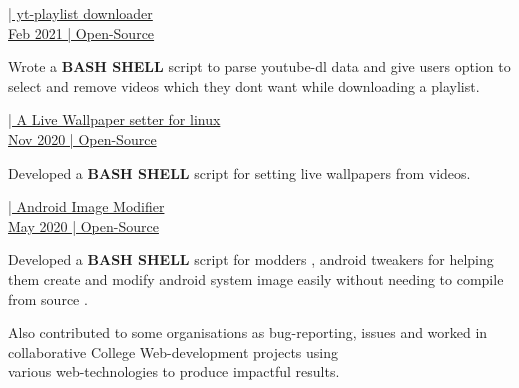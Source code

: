 \documentclass[]{deedy-resume-openfont}
\begin{document}
\begin{minipage}[t]{0.66\textwidth}
\href{https://github.com/creator54/yt-playlist}{| yt-playlist downloader }\\
\href{https://github.com/creator54/yt-playlist}{Feb 2021 | Open-Source}
\vspace{\topsep} %
\begin{tightemize}
\item Wrote a \textbf{BASH SHELL} script to parse youtube-dl data and give users option to select and remove videos which they dont want while downloading a playlist.
\end{tightemize}
\sectionsep

\href{https://github.com/creator54/wallsetter}{| A Live Wallpaper setter for linux }\\
\href{https://github.com/creator54/wallsetter}{Nov 2020 | Open-Source}
\vspace{\topsep} %
\begin{tightemize}
\item Developed a \textbf{BASH SHELL} script for setting live wallpapers from videos.
\end{tightemize}
\sectionsep

\href{https://github.com/creator54/aim}{| Android Image Modifier }\\
\href{https://github.com/creator54/aim}{May 2020 | Open-Source}
\vspace{\topsep} %
\begin{tightemize}
\item Developed a \textbf{BASH SHELL} script for modders , android tweakers for helping them create and modify android system image easily  without needing to compile from source .
\end{tightemize}
\sectionsep

Also contributed to some organisations as bug-reporting, issues and worked in collaborative College Web-development projects using \\various web-technologies to produce impactful results.

\end{minipage} 
\end{document}
